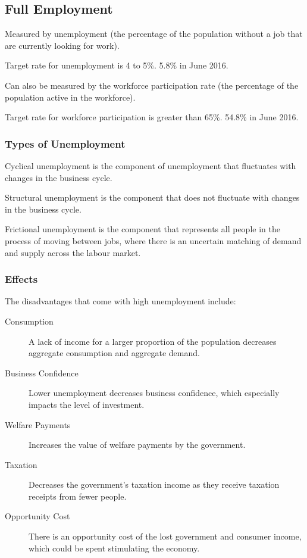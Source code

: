 \documentclass[a4paper,11pt]{article}
\begin{document}
\subsection{Full Employment}

Measured by unemployment (the percentage of the population without a job that
are currently looking for work).

Target rate for unemployment is 4 to 5\%. 5.8\% in June 2016.

Can also be measured by the workforce participation rate (the percentage of the
population active in the workforce).

Target rate for workforce participation is greater than 65\%. 54.8\% in June
2016.


\subsubsection{Types of Unemployment}

Cyclical unemployment is the component of unemployment that fluctuates with
changes in the business cycle.

Structural unemployment is the component that does not fluctuate with changes
in the business cycle.

Frictional unemployment is the component that represents all people in the
process of moving between jobs, where there is an uncertain matching of demand
and supply across the labour market.


\subsubsection{Effects}

The disadvantages that come with high unemployment include:

\begin{description}
\item [Consumption] A lack of income for a larger proportion of the population
	decreases aggregate consumption and aggregate demand.
\item [Business Confidence] Lower unemployment decreases business confidence,
	which especially impacts the level of investment.
\item [Welfare Payments] Increases the value of welfare payments by the
	government.
\item [Taxation] Decreases the government's taxation income as they receive
	taxation receipts from fewer people.
\item [Opportunity Cost] There is an opportunity cost of the lost government and
	consumer income, which could be spent stimulating the economy.
\end{description}
\end{document}
